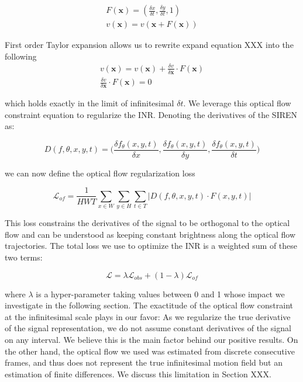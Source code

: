 \documentclass{article}
\begin{document}
\begin{equation}
\begin{aligned}
F(\textbf{x})=(\frac{\delta x}{\delta t}, \frac{\delta y}{\delta t}, 1) \\
v(\textbf{x})=v(\textbf{x} + F(\textbf{x}))
\end{aligned}
\end{equation}

First order Taylor expansion allows us to rewrite expand equation XXX into the following
\begin{equation}
\begin{aligned}
v(\textbf{x}) = v(\textbf{x}) + \frac{\delta v}{\delta \textbf{x}} \cdot F(\textbf{x}) \\
\frac{\delta v}{\delta \textbf{x}} \cdot F(\textbf{x}) =0
\end{aligned}
\end{equation}


which holds exactly in the limit of infinitesimal $\delta t$.
We leverage this optical flow constraint equation to regularize the INR.
Denoting the derivatives of the SIREN as:

\begin{equation}
D(f, \theta, x, y, t)=\Big(\frac{\delta f_{\theta}(x,y,t)}{\delta x}, \frac{\delta f_{\theta}(x,y,t)}{\delta y}, \frac{\delta f_{\theta}(x,y,t)}{\delta t}\Big)
\end{equation}

we can now define the optical flow regularization loss

\begin{equation}
\mathcal{L}_{of} = \frac{1}{HWT} \sum_{x \in W}\sum_{y \in H}\sum_{t \in T} | D(f, \theta, x, y, t) \cdot F(x, y, t) |
\end{equation}

This loss constrains the derivatives of the signal to be orthogonal to the optical flow and
can be understood as keeping constant brightness along the optical flow trajectories.
The total loss we use to optimize the INR is a weighted sum of these two terms:

\begin{equation}
\mathcal{L} = \lambda \mathcal{L}_{obs} + (1-\lambda) \mathcal{L}_{of}
\end{equation}

where $\lambda$ is a hyper-parameter taking values between 0 and 1 whose impact we investigate in the following section.
The exactitude of the optical flow constraint at the infinitesimal scale plays in our favor:
As we regularize the true derivative of the signal representation,
we do not assume constant derivatives of the signal on any interval.
We believe this is the main factor behind our positive results.
On the other hand, the optical flow we used was estimated from discrete consecutive frames,
and thus does not represent the true infinitesimal motion field but an estimation of finite differences.
We discuss this limitation in Section XXX.
\end{document}
